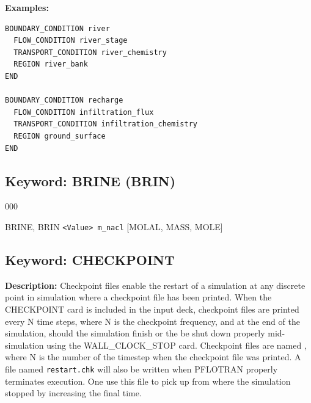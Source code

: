 \documentclass[12pt]{article}
\begin{document}
\newpage
\begin{mdframed}

{\noindent\bf Examples:}

\begin{verbatim}
BOUNDARY_CONDITION river
  FLOW_CONDITION river_stage
  TRANSPORT_CONDITION river_chemistry
  REGION river_bank
END

BOUNDARY_CONDITION recharge
  FLOW_CONDITION infiltration_flux
  TRANSPORT_CONDITION infiltration_chemistry
  REGION ground_surface
END
\end{verbatim}

\end{mdframed}

\hyperlink{target_key}{\return}


\newpage
\protect\hypertarget{target_brine}{}

\subsection{Keyword: BRINE (BRIN)}

\begin{deflist}{000}
\item[BRINE, BRIN] {\tt <Value> m\_nacl} [MOLAL, MASS, MOLE]
\end{deflist}

\hyperlink{target_key}{\return}


\newpage
\protect\hypertarget{target_ckpt}{}

\subsection{Keyword: CHECKPOINT}
{\noindent\bf Description:}
Checkpoint files enable the restart of a simulation at any discrete point in simulation where a checkpoint file has been printed.  When the CHECKPOINT card is included in the input deck, checkpoint files are printed every N time steps, where N is the checkpoint frequency, and at the end of the simulation, should the simulation finish or the be shut down properly mid-simulation using the WALL\_CLOCK\_STOP card.  Checkpoint files are named , where N is the number of the timestep when the checkpoint file was printed.
A file named {\tt restart.chk} will also be written when PFLOTRAN properly terminates execution. One use this file to pick up from where the simulation stopped by increasing the final time.
\end{document}
